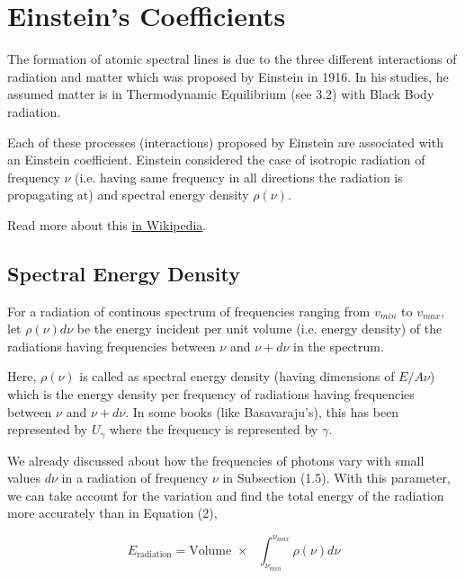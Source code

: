 \documentclass[12pt]{article}
\begin{document}
\section{Einstein's Coefficients}

The formation of atomic spectral lines is due to the three different interactions of radiation and matter which was proposed by Einstein in 1916. In his studies, he assumed matter is in Thermodynamic Equilibrium (see 3.2) with Black Body radiation. \vspace{.2cm}

Each of these processes (interactions) proposed by Einstein are associated with an Einstein coefficient. Einstein considered the case of isotropic radiation of frequency $\nu$ (i.e. having same frequency in all directions the radiation is propagating at) and spectral energy density $\rho(\nu)$. \vspace{.2cm}

Read more about this \href{https://en.wikipedia.org/wiki/Einstein_coefficients}{in Wikipedia}.

\subsection{Spectral Energy Density}

For a radiation of continous spectrum of frequencies ranging from $v_{min}$ to $v_{max}$, let $\rho(\nu)d\nu$ be the energy incident per unit volume (i.e. energy density) of the radiations having frequencies between $\nu$ and $\nu + d\nu$ in the spectrum. \vspace{.2cm}

Here, $\rho(\nu)$ is called as spectral energy density (having dimensions of $E/A\nu$) which is the energy density per frequency of radiations having frequencies between $\nu$ and $\nu + d\nu$. In some books (like Basavaraju's), this has been represented by $U_{\gamma}$ where the frequency is represented by $\gamma$. \vspace{.2cm}

We already discussed about how the frequencies of photons vary with small values $d\nu$ in a radiation of frequency $\nu$ in Subsection (1.5). With this parameter, we can take account for the variation and find the total energy of the radiation more accurately than in Equation (2),

\begin{equation}
    E_{\text{radiation}} = \text{Volume } \times \text{ } \int_{\nu_{min}}^{\nu_{max}} \rho(\nu) d\nu
\end{equation} \vspace{.2cm}
\end{document}
